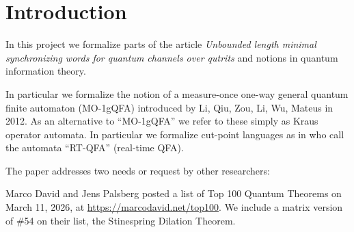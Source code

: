 \begin{abstract}
Wiedijk has a famous list of 100 mathematical theorems whose formalization is sought in a proof assistant.
David and Palsberg recently announced a similar list restricted to quantum information theory.
The latter subject has been intensively formalized by Meiburg.
In this article our aim is twofold:
(1) to answer the challenge of David and Palsberg by supplying a solution to a finite-dimensional version of their problem \#54: formalize the Stinespring dilation theorem;
(2) answer an unpublished challenge by Meiburg to formalize quantum finite automata.
\end{abstract}

%
\section{Introduction}
In this project we formalize parts of the article \emph{Unbounded length minimal synchronizing words for quantum channels over qutrits} \cite{kjoshanssen2026unboundedlengthminimalsynchronizing} and notions in quantum information theory.

In particular we formalize the notion of a measure-once one-way general quantum finite automaton (MO-1gQFA) introduced by Li, Qiu, Zou, Li, Wu, Mateus \cite{MR2885820} in 2012. As an alternative to ``MO-1gQFA'' we refer to these simply as Kraus operator automata. In particular we formalize cut-point languages as in
\cite{MR2817180} who call the automata ``RT-QFA'' (real-time QFA). 

The paper addresses two needs or request by other researchers:

Marco David and Jens Palsberg posted a list of Top 100 Quantum Theorems on March 11, 2026, at \url{https://marcodavid.net/top100}.
We include a matrix version of \#54 on their list, the Stinespring Dilation Theorem.


